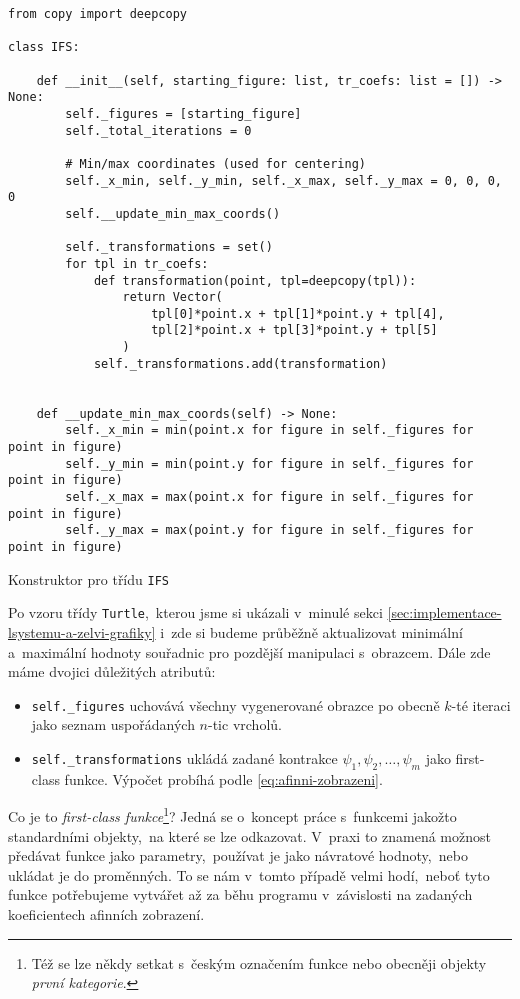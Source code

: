 \begin{program}[h]
\begin{lstlisting}[style=python]
from copy import deepcopy

class IFS:

    def __init__(self, starting_figure: list, tr_coefs: list = []) -> None:
        self._figures = [starting_figure]
        self._total_iterations = 0

        # Min/max coordinates (used for centering)
        self._x_min, self._y_min, self._x_max, self._y_max = 0, 0, 0, 0
        self.__update_min_max_coords()

        self._transformations = set()
        for tpl in tr_coefs:
            def transformation(point, tpl=deepcopy(tpl)):
                return Vector(
                    tpl[0]*point.x + tpl[1]*point.y + tpl[4],
                    tpl[2]*point.x + tpl[3]*point.y + tpl[5]
                )
            self._transformations.add(transformation)
    
    
    def __update_min_max_coords(self) -> None:
        self._x_min = min(point.x for figure in self._figures for point in figure)
        self._y_min = min(point.y for figure in self._figures for point in figure)
        self._x_max = max(point.x for figure in self._figures for point in figure)
        self._y_max = max(point.y for figure in self._figures for point in figure)
\end{lstlisting}
    \caption{Konstruktor pro třídu \texttt{IFS}}
    \label{prog:konstruktor-ifs}
\end{program}
Po vzoru třídy \texttt{Turtle},~kterou jsme si ukázali v~minulé sekci \ref{sec:implementace-lsystemu-a-zelvi-grafiky} i~zde si budeme průběžně aktualizovat minimální a~maximální hodnoty souřadnic pro pozdější manipulaci s~obrazcem. Dále zde máme dvojici důležitých atributů:
\begin{itemize}
    \item \texttt{self.\_figures} uchovává všechny vygenerované obrazce po obecně $k$-té iteraci jako seznam uspořádaných $n$-tic vrcholů.
    \item \texttt{self.\_transformations} ukládá zadané kontrakce $\psi_1,\psi_2,\ldots,\psi_m$ jako first-class funkce. Výpočet probíhá podle \eqref{eq:afinni-zobrazeni}.
\end{itemize}
Co je to \emph{first-class funkce}\footnote{Též se lze někdy setkat s~českým označením funkce nebo obecněji objekty \emph{první kategorie}.}? Jedná se o~koncept práce s~funkcemi jakožto standardními objekty,~na které se lze odkazovat. V~praxi to znamená možnost předávat funkce jako parametry,~používat je jako návratové hodnoty,~nebo ukládat je do proměnných. To se nám v~tomto případě velmi hodí,~neboť tyto funkce potřebujeme vytvářet až za běhu programu v~závislosti na zadaných koeficientech afinních zobrazení.

